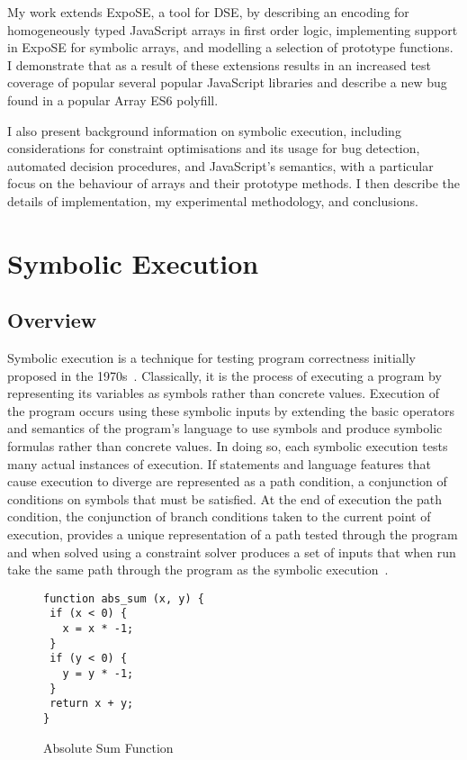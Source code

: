 \documentclass[]{final_report}
\begin{document}
My work extends ExpoSE, a tool for DSE, by describing an encoding for homogeneously typed JavaScript arrays in first order logic, implementing support in ExpoSE for symbolic arrays, and modelling a selection of prototype functions. I demonstrate that as a result of these extensions results in an increased test coverage of popular several popular JavaScript libraries and describe a new bug found in a popular Array ES6 polyfill.

I also present background information on symbolic execution, including considerations for constraint optimisations and its usage for bug detection, automated decision procedures, and JavaScript's semantics, with a particular focus on the behaviour of arrays and their prototype methods. I then describe the details of implementation, my experimental methodology, and conclusions.

\chapter{Symbolic Execution}

\section{Overview}

Symbolic execution is a technique for testing program correctness initially proposed in the 1970s~\cite{king1976symbolic, boyer1975select}. Classically, it is the process of executing a program by representing its variables as symbols rather than concrete values. Execution of the program occurs using these symbolic inputs by extending the basic operators and semantics of the program's language to use symbols and produce symbolic formulas rather than concrete values. In doing so, each symbolic execution tests many actual instances of execution. If statements and language features that cause execution to diverge are represented as a path condition, a conjunction of conditions on symbols that must be satisfied. At the end of execution the path condition, the conjunction of branch conditions taken to the current point of execution, provides a unique representation of a path tested through the program and when solved using a constraint solver produces a set of inputs that when run take the same path through the program as the symbolic execution~\cite{godefroid2008automated, godefroid2005dart}.

\begin{figure}[h]
\begin{lstlisting}
function abs_sum (x, y) {
 if (x < 0) {
   x = x * -1;
 }
 if (y < 0) {
   y = y * -1;
 }
 return x + y;
}
\end{lstlisting}
\caption{\label{fig:abs-sum} Absolute Sum Function}
\end{figure} 
\end{document}
